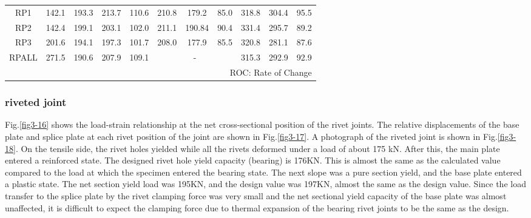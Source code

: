 \begin{table}[]
\begin{tabular}{@{}ccccccccccc@{}}
    RP1                   & 142.1                 & 193.3     & 213.7     & 110.6     & 210.8       & 179.2        & 85.0       & 318.8       & 304.4       & 95.5      \\
    RP2                   & 142.4                 & 199.1     & 203.1     & 102.0     & 211.1       & 190.84       & 90.4       & 331.4       & 295.7       & 89.2      \\
    RP3                   & 201.6                 & 194.1     & 197.3     & 101.7     & 208.0       & 177.9        & 85.5       & 320.8       & 281.1       & 87.6      \\
    RPALL                 & 271.5                 & 190.6     & 207.9     & 109.1     & \multicolumn{3}{c}{-}                   & 315.3       & 292.9       & 92.9      \\ \midrule
    \multicolumn{11}{r}{ROC: Rate of Change}                                                                                                                           
    \end{tabular}
\end{table}

\subsubsection{riveted joint}

Fig.\ref{fig3-16} shows the load-strain relationship at the net cross-sectional position of the rivet joints. The relative displacements of the base plate and splice plate at each rivet position of the joint are shown in Fig.\ref{fig3-17}. A photograph of the riveted joint is shown in Fig.\ref{fig3-18}. On the tensile side, the rivet holes yielded while all the rivets deformed under a load of about 175 kN. After this, the main plate entered a reinforced state. The designed rivet hole yield capacity (bearing) is 176KN. This is almost the same as the calculated value compared to the load at which the specimen entered the bearing state. The next slope was a pure section yield, and the base plate entered a plastic state. The net section yield load was 195KN, and the design value was 197KN, almost the same as the design value. Since the load transfer to the splice plate by the rivet clamping force was very small and the net sectional yield capacity of the base plate was almost unaffected, it is difficult to expect the clamping force due to thermal expansion of the bearing rivet joints to be the same as the design.

